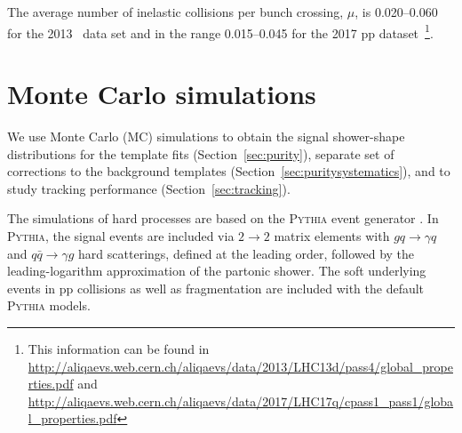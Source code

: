 The average number of inelastic collisions per bunch crossing, $\mu$, is 0.020--0.060 for the 2013 \pPb~data set and in the range 0.015--0.045 for the 2017 pp dataset~\footnote{This information can be found in \url{http://aliqaevs.web.cern.ch/aliqaevs/data/2013/LHC13d/pass4/global_properties.pdf} and \url{http://aliqaevs.web.cern.ch/aliqaevs/data/2017/LHC17q/cpass1_pass1/global_properties.pdf}}.%







\section{Monte Carlo simulations}
\label{sec:mcsimulations}
We use Monte Carlo (MC) simulations to obtain the signal shower-shape distributions for the template fits (Section~\ref{sec:purity}), separate set of corrections to the background templates (Section~\ref{sec:puritysystematics}), and to study tracking performance (Section~\ref{sec:tracking}).

The simulations of hard processes are based on the \textsc{Pythia} event generator \cite{zotero-332}. In \textsc{Pythia}, the signal events are included via $2\to2$ matrix elements with $gq\to\gamma q$ and $q\bar{q}\to\gamma g$ hard scatterings, defined at the leading order, followed by the leading-logarithm approximation of the partonic shower. The soft underlying events in pp collisions as well as fragmentation are included with the default \textsc{Pythia} models. 

